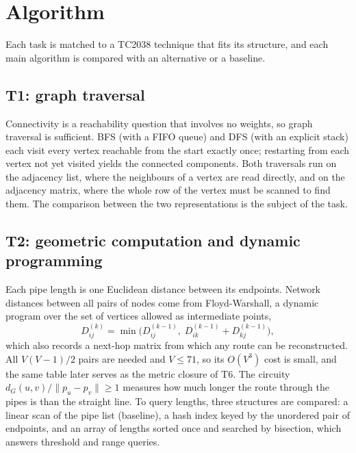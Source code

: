 \section{Algorithm}\label{sec:algorithm}
Each task is matched to a TC2038 technique that fits its structure, and each main algorithm is compared with an alternative or a baseline.

\subsection{T1: graph traversal}
Connectivity is a reachability question that involves no weights, so graph traversal is sufficient. BFS (with a FIFO queue) and DFS (with an explicit stack) each visit every vertex reachable from the start exactly once; restarting from each vertex not yet visited yields the connected components. Both traversals run on the adjacency list, where the neighbours of a vertex are read directly, and on the adjacency matrix, where the whole row of the vertex must be scanned to find them. The comparison between the two representations is the subject of the task.

\subsection{T2: geometric computation and dynamic programming}
Each pipe length is one Euclidean distance between its endpoints. Network distances between all pairs of nodes come from Floyd-Warshall, a dynamic program over the set of vertices allowed as intermediate points,
\begin{equation}
    D^{(k)}_{ij}=\min\bigl(D^{(k-1)}_{ij},\;D^{(k-1)}_{ik}+D^{(k-1)}_{kj}\bigr),
\end{equation}
which also records a next-hop matrix from which any route can be reconstructed. All $V(V-1)/2$ pairs are needed and $V\le71$, so its $O(V^3)$ cost is small, and the same table later serves as the metric closure of T6. The circuity $d_G(u,v)/\lVert p_u-p_v\rVert\ge1$ measures how much longer the route through the pipes is than the straight line. To query lengths, three structures are compared: a linear scan of the pipe list (baseline), a hash index keyed by the unordered pair of endpoints, and an array of lengths sorted once and searched by bisection, which answers threshold and range queries.

